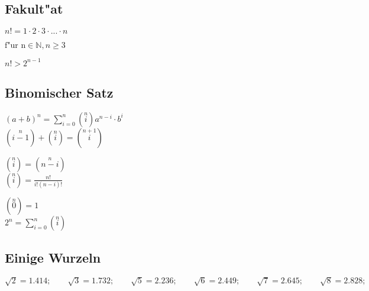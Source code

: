 \subsection{Fakult"at}
	\begin{minipage}[c]{6cm}
		$n! = 1\cdot2\cdot3\cdot...\cdot n $
	\end{minipage}
	\begin{minipage}[c]{6cm}
		$\text{f"ur n} \in \mathbb{N}, n \geq 3$
	\end{minipage}
	\begin{minipage}[c]{6cm}
		$n!>2^{n-1}$
	\end{minipage}
	
\subsection{Binomischer Satz}
	\begin{minipage}[c]{6cm}
		$\left(a+b\right)^n = \sum\limits _{i=0}^n \left(\stackrel{n}{i}\right)a^{n-i}\cdot b^i$\\
		$\left(\stackrel{n}{i-1}\right)+\left(\stackrel{n}{i}\right)=\left(\stackrel{n+1}{i}\right)$
	\end{minipage}
	\begin{minipage}[c]{6cm}
		$\left(\stackrel{n}{i}\right)=\left(\stackrel{n}{n-i}\right)$\\
		$\left(\stackrel{n}{i}\right)=\frac{n!}{i!\left(n-i\right)!}$
	\end{minipage}
	\begin{minipage}[c]{6cm}	
		$\left(\stackrel{n}{0}\right)=1$\\
		$2^n = \sum\limits _{i=0}^n \left(\stackrel{n}{i}\right)$
	\end{minipage}
	
\subsection{Einige Wurzeln}
$\sqrt{2} = 1.414; \qquad \sqrt{3} = 1.732; \qquad \sqrt{5} = 2.236; \qquad \sqrt{6} = 2.449; \qquad \sqrt{7} = 2.645; \qquad \sqrt{8} = 2.828;$